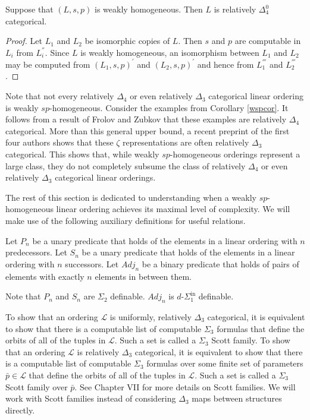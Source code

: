 \documentclass[11pt]{amsart}
\theoremstyle{definition}
\newcommand{\dSinf}[1]{d\text{-}\Sigma^{\mathrm{in}}_{#1}}
\def\L{\mathcal L}
\begin{document}
\begin{proposition} Suppose that $(L,s,p)$ is weakly homogeneous. Then $L$ is relatively $\Delta^0_4$ categorical.  
\end{proposition}

\begin{proof} Let $L_1$ and $L_2$ be isomorphic copies of $L$. Then $s$ and $p$ are computable in $L_i$ from $L_i^{''}$. Since $L$ is weakly homogeneous, an isomorphism between $L_1$ and $L_2$ may be computed from $(L_1,s,p)^{'}$ and $(L_2,s,p)^{'}$ and hence from $L_1^{'''}$ and $L_2^{'''}$. 
\end{proof}


Note that not every relatively $\Delta_4$ or even relatively $\Delta_3$ categorical linear ordering is weakly $sp$-homogeneous.
Consider the examples from Corollary \ref{wspcor}.
It follows from a result of Frolov and Zubkov \cite{FZ24} that these examples are relatively $\Delta_4$ categorical.
More than this general upper bound, a recent preprint of the first four authors shows that these $\zeta$ representations are often relatively $\Delta_3$ categorical.
This shows that, while weakly $sp$-homogeneous orderings represent a large class, they do not completely subsume the class of relatively $\Delta_4$ or even relatively $\Delta_3$ categorical linear orderings.

The rest of this section is dedicated to understanding when a weakly $sp$-homogeneous linear ordering achieves its maximal level of complexity.
We will make use of the following auxiliary definitions for useful relations.

\begin{definition}
    Let $P_n$ be a unary predicate that holds of the elements in a linear ordering with $n$ predecessors.
    Let $S_n$ be a unary predicate that holds of the elements in a linear ordering with $n$ successors.
    Let $Adj_n$ be a binary predicate that holds of pairs of elements with exactly $n$ elements in between them.
\end{definition}

Note that $P_n$ and $S_n$ are $\Sigma_2$ definable.
$Adj_n$ is $\dSinf{1}$ definable.

To show that an ordering $\L$ is uniformly, relatively $\Delta_3$ categorical, it is equivalent to show that there is a computable list of computable $\Sigma_3$ formulas that define the orbits of all of the tuples in $\L$.
Such a set is called a $\Sigma_3$ Scott family.
To show that an ordering $\L$ is relatively $\Delta_3$ categorical, it is equivalent to show that there is a computable list of computable $\Sigma_3$ formulas over some finite set of parameters $\bar{p}\in \L$ that define the orbits of all of the tuples in $\L$.
Such a set is called a $\Sigma_3$ Scott family over $\bar{p}$.
See \cite{cst2} Chapter VII for more details on Scott families.
We will work with Scott families instead of considering $\Delta_3$ maps between structures directly.
\end{document}
